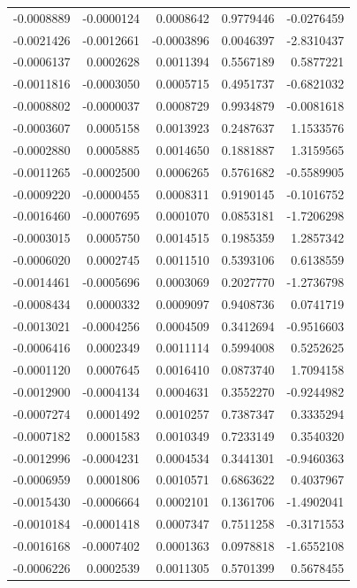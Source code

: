 \documentclass[]{tufte-handout}
\begin{document}
\begin{longtable}[]{@{}rrrrr@{}}
-0.0008889 & -0.0000124 & 0.0008642 & 0.9779446 & -0.0276459 \\
-0.0021426 & -0.0012661 & -0.0003896 & 0.0046397 & -2.8310437 \\
-0.0006137 & 0.0002628 & 0.0011394 & 0.5567189 & 0.5877221 \\
-0.0011816 & -0.0003050 & 0.0005715 & 0.4951737 & -0.6821032 \\
-0.0008802 & -0.0000037 & 0.0008729 & 0.9934879 & -0.0081618 \\
-0.0003607 & 0.0005158 & 0.0013923 & 0.2487637 & 1.1533576 \\
-0.0002880 & 0.0005885 & 0.0014650 & 0.1881887 & 1.3159565 \\
-0.0011265 & -0.0002500 & 0.0006265 & 0.5761682 & -0.5589905 \\
-0.0009220 & -0.0000455 & 0.0008311 & 0.9190145 & -0.1016752 \\
-0.0016460 & -0.0007695 & 0.0001070 & 0.0853181 & -1.7206298 \\
-0.0003015 & 0.0005750 & 0.0014515 & 0.1985359 & 1.2857342 \\
-0.0006020 & 0.0002745 & 0.0011510 & 0.5393106 & 0.6138559 \\
-0.0014461 & -0.0005696 & 0.0003069 & 0.2027770 & -1.2736798 \\
-0.0008434 & 0.0000332 & 0.0009097 & 0.9408736 & 0.0741719 \\
-0.0013021 & -0.0004256 & 0.0004509 & 0.3412694 & -0.9516603 \\
-0.0006416 & 0.0002349 & 0.0011114 & 0.5994008 & 0.5252625 \\
-0.0001120 & 0.0007645 & 0.0016410 & 0.0873740 & 1.7094158 \\
-0.0012900 & -0.0004134 & 0.0004631 & 0.3552270 & -0.9244982 \\
-0.0007274 & 0.0001492 & 0.0010257 & 0.7387347 & 0.3335294 \\
-0.0007182 & 0.0001583 & 0.0010349 & 0.7233149 & 0.3540320 \\
-0.0012996 & -0.0004231 & 0.0004534 & 0.3441301 & -0.9460363 \\
-0.0006959 & 0.0001806 & 0.0010571 & 0.6863622 & 0.4037967 \\
-0.0015430 & -0.0006664 & 0.0002101 & 0.1361706 & -1.4902041 \\
-0.0010184 & -0.0001418 & 0.0007347 & 0.7511258 & -0.3171553 \\
-0.0016168 & -0.0007402 & 0.0001363 & 0.0978818 & -1.6552108 \\
-0.0006226 & 0.0002539 & 0.0011305 & 0.5701399 & 0.5678455 \\

\end{longtable}
\end{document}
